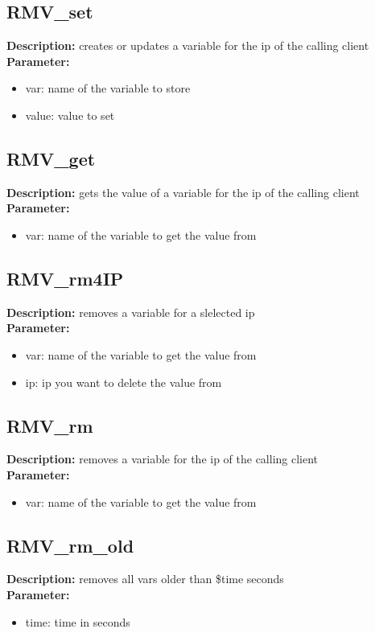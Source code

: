 \subsection{RMV\_set}
\textbf{Description:} creates or updates a variable for the ip of the calling client\\
\textbf{Parameter:}
\begin{itemize}
\item var: name of the variable to store
\item value: value to set
\end{itemize}

\subsection{RMV\_get}
\textbf{Description:} gets the value of a variable for the ip of the calling client\\
\textbf{Parameter:}
\begin{itemize}
\item var: name of the variable to get the value from
\end{itemize}

\subsection{RMV\_rm4IP}
\textbf{Description:} removes a variable for a slelected ip\\
\textbf{Parameter:}
\begin{itemize}
\item var: name of the variable to get the value from
\item ip: ip you want to delete the value from
\end{itemize}

\subsection{RMV\_rm}
\textbf{Description:} removes a variable for the ip of the calling client\\
\textbf{Parameter:}
\begin{itemize}
\item var: name of the variable to get the value from
\end{itemize}

\subsection{RMV\_rm\_old}
\textbf{Description:} removes all vars older than \$time seconds\\
\textbf{Parameter:}
\begin{itemize}
\item time: time in seconds
\end{itemize}

